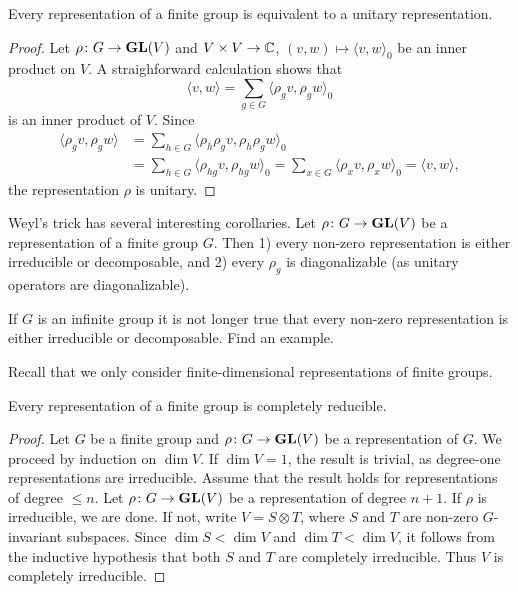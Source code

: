 \begin{proposition}
    Every representation of a finite group is equivalent to a unitary representation.
\end{proposition}

\begin{proof}
    Let $\rho\colon G\to\mathbf{GL}(V)$ and $V\times V\to\mathbb{C}$, $(v,w)\mapsto\langle v,w\rangle_0$ be an inner
    product on $V$. A straighforward calculation shows that
    \[
    \langle v,w\rangle=\sum_{g\in G}\langle\rho_gv,\rho_gw\rangle_0
    \]
    is an inner product of $V$. Since
    \begin{align*}
    \langle\rho_gv,\rho_gw\rangle&=\sum_{h\in G}\langle\rho_h\rho_gv,\rho_h\rho_gw\rangle_0\\
    &=\sum_{h\in G}\langle\rho_{hg}v,\rho_{hg}w\rangle_0=\sum_{x\in G}\langle\rho_xv,\rho_xw\rangle_0=\langle v,w\rangle,
    \end{align*}
    the representation $\rho$ is unitary.
\end{proof}

Weyl's trick has several interesting corollaries. Let $\rho\colon G\to\mathbf{GL}(V)$ be a representation
of a finite group $G$. Then 1) every non-zero representation is either
irreducible or decomposable, and 2) every $\rho_g$ is diagonalizable
(as unitary operators are diagonalizable).

\begin{exercise}
    If $G$ is an infinite group it is not longer true that every non-zero representation
    is either irreducible or decomposable. Find an example.
\end{exercise}

Recall that we only consider finite-dimensional representations of finite groups.

\begin{theorem}[Maschke]
    Every representation of a finite group is completely reducible.
\end{theorem}

\begin{proof}
    Let $G$ be a finite group and $\rho\colon G\to\mathbf{GL}(V)$ be a representation of $G$. We proceed
    by induction on $\dim V$.
    If $\dim V=1$, the result is trivial, as degree-one representations are irreducible. Assume that
    the result holds for representations of degree $\leq n$. Let $\rho\colon G\to\mathbf{GL}(V)$ be a representation
    of degree $n+1$. If $\rho$ is irreducible, we are done. If not, write $V=S\otimes T$, where $S$ and $T$
    are non-zero $G$-invariant subspaces. Since $\dim S<\dim V$ and $\dim T<\dim V$, it follows from
    the inductive hypothesis that
    both $S$ and $T$ are completely irreducible. Thus $V$ is completely irreducible.
\end{proof}

